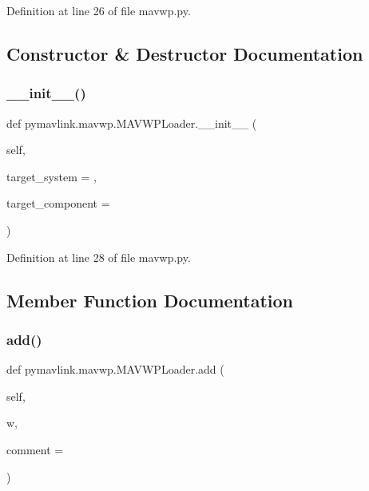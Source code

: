 Definition at line 26 of file mavwp.\+py.



\subsection{Constructor \& Destructor Documentation}
\mbox{\label{classpymavlink_1_1mavwp_1_1MAVWPLoader_a08660f56f7e491e1a734f8157c5246de}} 
\subsubsection{\texorpdfstring{\_\_init\_\_()}{\_\_init\_\_()}}
{\footnotesize\ttfamily def pymavlink.\+mavwp.\+M\+A\+V\+W\+P\+Loader.\+\_\+\+\_\+init\+\_\+\+\_\+ (\begin{DoxyParamCaption}\item[{}]{self,  }\item[{}]{target\+\_\+system = {},  }\item[{}]{target\+\_\+component = {} }\end{DoxyParamCaption})}



Definition at line 28 of file mavwp.\+py.



\subsection{Member Function Documentation}
\mbox{\label{classpymavlink_1_1mavwp_1_1MAVWPLoader_a32b224f0d31c036f92415dddeaa82b5d}} 
\subsubsection{\texorpdfstring{add()}{add()}}
{\footnotesize\ttfamily def pymavlink.\+mavwp.\+M\+A\+V\+W\+P\+Loader.\+add (\begin{DoxyParamCaption}\item[{}]{self,  }\item[{}]{w,  }\item[{}]{comment = {\ttfamily \textquotesingle{}\textquotesingle{}} }\end{DoxyParamCaption})}

